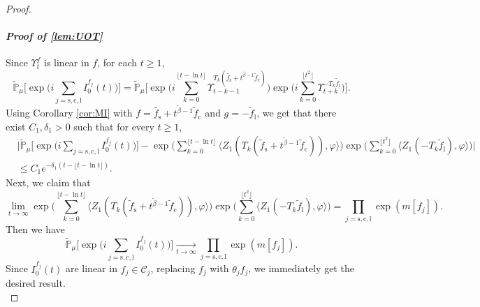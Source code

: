 \documentclass[12pt,a4paper]{amsart}
\theoremstyle{plain}
\theoremstyle{definition}
\numberwithin{equation}{section}
\begin{document}
\begin{proof}
\paragraph{\it Proof of \eqref{lem:UOT}}
Since $\Upsilon_t^f$ is linear in $f$, for each $t\geq 1$,
\[
\widetilde{\mathbb P}_{\mu}\Big[\exp\Big(i
\sum_{j=\mathrm s,\mathrm c,\mathrm l}I_0^{f_j}(t)\Big)\Big]
= \widetilde{\mathbb P}_{\mu}\Big[\exp\Big(i\sum_{k=0}^{\lfloor t-\ln t \rfloor}\Upsilon_{t-k-1}^{T_k(\tilde{f_\mathrm s}+t^{\tilde{\beta}-1} \tilde{f}_{\mathrm c})}\Big)\exp\Big(i\sum_{k=0}^{\lfloor t^2 \rfloor}\Upsilon_{t+k}^{-T_k\tilde{f}_{\mathrm l}}\Big)\Big].
\]
Using Corollary \ref{cor:MI} with $f=\tilde{f_\mathrm s}+t^{\tilde{\beta}-1} \tilde{f}_{\mathrm c}$ and $g = -\tilde{f}_{\mathrm l}$, we get that there exist $C_1,\delta_1 > 0$ such that
for every $t\geq 1$,
  \begin{align}
    &\Big|\widetilde{\mathbb P}_{\mu}\Big[\exp\Big(i \sum_{j=\mathrm s,\mathrm c,\mathrm l}I_0^{f_j}(t)\Big)\Big]
    -\exp\Big(\sum_{k=0}^{\lfloor t-\ln t \rfloor} \langle Z_1(T_{k}(\tilde f_\mathrm s+t^{\tilde{\beta}-1}\tilde{f}_{\mathrm c})), \varphi\rangle \Big)\exp\Big(\sum_{k=0}^{\lfloor t^2 \rfloor}\langle Z_1(-T_k\tilde{f}_{\mathrm l}),\varphi\rangle\Big)\Big|\\
    &\leq C_1 e^{-\delta_1(t - \lfloor t - \ln t\rfloor)}.
  \end{align}
Next, we claim that
\begin{equation} \label{eq:UOT.1}
\lim_{t\rightarrow\infty}\exp\Big(\sum_{k=0}^{\lfloor t-\ln t \rfloor} \langle Z_1(T_{k}(\tilde f_\mathrm s+t^{\tilde{\beta}-1}\tilde{f}_\mathrm c)), \varphi\rangle \Big)\exp\Big(\sum_{k=0}^{\lfloor t^2 \rfloor}\langle Z_1(-T_k\tilde{f}_\mathrm l),\varphi\rangle\Big) =
\prod_{j=\mathrm s,\mathrm c,\mathrm l}\exp(m[f_j]).
\end{equation}
 Then we have
\[
	\widetilde{\mathbb P}_{\mu}\Big[\exp\Big(i
	\sum_{j=\mathrm s,\mathrm c,\mathrm l}I_0^{f_j}(t)\Big)\Big]
	 \xrightarrow[t\to \infty]{} 
	 \prod_{j=\mathrm s,\mathrm c,\mathrm l}\exp(m[f_j]).
\]
 Since $I_0^{f_j}(t)$ are linear in $f_j\in \mathcal C_j$, replacing $f_j$ with $\theta_j f_j$, we immediately get the desired result.
\\

\end{proof}
\end{document}
